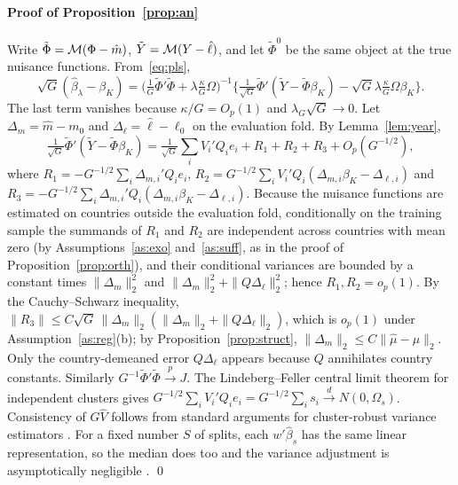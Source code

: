 \documentclass[preprint,12pt,authoryear]{elsarticle}
\begin{document}
\paragraph{Proof of Proposition~\ref{prop:an}}
Write $\tilde\Phi=\mathcal{M}(\Phi-\hat m)$, $\tilde Y=\mathcal{M}(Y-\hat\ell)$, and let $\tilde\Phi^0$ be the same object at the true nuisance functions. From~\eqref{eq:pls},
\[
\sqrt G(\hat\beta_\lambda-\beta_K)=\Big(\tfrac1G\tilde\Phi'\tilde\Phi+\lambda\tfrac\kappa G\Omega\Big)^{-1}\Big\{\tfrac1{\sqrt G}\tilde\Phi'(\tilde Y-\tilde\Phi\beta_K)-\sqrt G\lambda\tfrac\kappa G\Omega\beta_K\Big\}.
\]
The last term vanishes because $\kappa/G=O_p(1)$ and $\lambda_G\sqrt G\to0$. Let $\Delta_m=\hat m-m_0$ and $\Delta_\ell=\hat\ell-\ell_0$ on the evaluation fold. By Lemma~\ref{lem:year},
\[
\tfrac1{\sqrt G}\tilde\Phi'(\tilde Y-\tilde\Phi\beta_K)=\tfrac1{\sqrt G}\sum_iV_i'Q_ie_i+R_1+R_2+R_3+O_p(G^{-1/2}),
\]
where $R_1=-G^{-1/2}\sum_i\Delta_{m,i}'Q_ie_i$, $R_2=G^{-1/2}\sum_iV_i'Q_i(\Delta_{m,i}\beta_K-\Delta_{\ell,i})$ and $R_3=-G^{-1/2}\sum_i\Delta_{m,i}'Q_i(\Delta_{m,i}\beta_K-\Delta_{\ell,i})$. Because the nuisance functions are estimated on countries outside the evaluation fold, conditionally on the training sample the summands of $R_1$ and $R_2$ are independent across countries with mean zero (by Assumptions~\ref{as:exo} and~\ref{as:suff}, as in the proof of Proposition~\ref{prop:orth}), and their conditional variances are bounded by a constant times $\|\Delta_m\|_2^2$ and $\|\Delta_m\|_2^2+\|Q\Delta_\ell\|_2^2$; hence $R_1,R_2=o_p(1)$. By the Cauchy--Schwarz inequality, $\|R_3\|\le C\sqrt G\,\|\Delta_m\|_2(\|\Delta_m\|_2+\|Q\Delta_\ell\|_2)$, which is $o_p(1)$ under Assumption~\ref{as:reg}(b); by Proposition~\ref{prop:struct}, $\|\Delta_m\|_2\le C\|\hat\mu-\mu\|_2$. Only the country-demeaned error $Q\Delta_\ell$ appears because $Q$ annihilates country constants. Similarly $G^{-1}\tilde\Phi'\tilde\Phi\xrightarrow{p}J$. The Lindeberg--Feller central limit theorem for independent clusters gives $G^{-1/2}\sum_iV_i'Q_ie_i=G^{-1/2}\sum_is_i\xrightarrow{d}N(0,\Omega_s)$. Consistency of $G\hat V$ follows from standard arguments for cluster-robust variance estimators \citep{cameron2015cluster}. For a fixed number $S$ of splits, each $w'\hat\beta_s$ has the same linear representation, so the median does too and the variance adjustment is asymptotically negligible \citep{chernozhukov2018dml}. \qed
\end{document}
